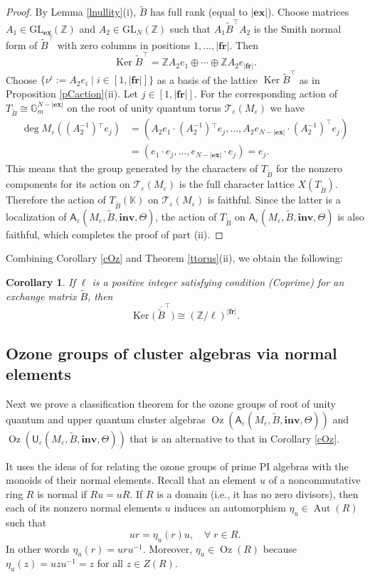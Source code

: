 \documentclass[11pt]{amsart}
\theoremstyle{plain}
\newtheorem{corollary}[theorem]{Corollary}
\newcommand \bco[1] { \begin{corollary}\label{c#1} }
\newcommand {\eco} { \end{corollary} }
\newcommand \thref[1]{Theorem \ref{t#1}}
\newcommand \leref[1]{Lemma \ref{l#1}}
\newcommand \prref[1]{Proposition \ref{p#1}}
\newcommand \coref[1]{Corollary \ref{c#1}}
\def \KK {{\mathbb C}}
\def \KK {{\mathbb K}}
\def \Gset {{\mathbb G}}
\def \Zset {{\mathbb Z}}
\def \A {{\boldsymbol{\mathsf A}}}
\def \U {{\boldsymbol{\mathsf U}}}
\def \B  {{\widetilde{B}}}
\newcommand \ex {{\mathbf{ex}}}
\newcommand \fr {{\mathbf{fr}}}
\newcommand \inv {{\mathbf{inv}}}
\def \TT {{\mathcal{T}}}
\def \ep {\varepsilon}
\def \ol {\overline}
\DeclareMathOperator \Aut { {\mathrm{Aut}} }
\DeclareMathOperator \Oz { {\mathrm{Oz}}}
\DeclareMathOperator \Ker { {\mathrm{Ker}} }
\begin{document}
\begin{proof}
By \leref{nullity}(i), $\B$ has full rank (equal to $|\ex|$). Choose matrices $A_1 \in \mathrm{GL}_{\ex}(\Zset)$ and 
$A_2 \in \mathrm{GL}_N(\Zset)$ such that 
$A_1 \B^\top A_2$ is the Smith normal form of $\B^\top$ with zero columns in positions $1, \ldots, |\fr|$. Then 
\[
\Ker \B^\top = \Zset A_2 e_1 \oplus \cdots \oplus \Zset A_2 e_{|\fr|}.
\]
Choose $\{\nu^i := A_2 e_i \mid i \in [1, |\fr|]\}$ as a basis of the lattice $\Ker \B^\top$ as in \prref{Caction}(ii). Let $j \in [1, |\fr|]$.
For the corresponding action of $T_{\B} \cong \Gset_m^{N - |\ex|}$ on the root of unity quantum torus $\TT_\ep(M_\ep)$ we have 
\begin{align*}
\deg M_\ep((A_2^{-1}){^\top} e_j ) &= 
(A_2 e_1 \cdot (A_2^{-1}){^\top} e_j, \dots, A_2e_{N-|\ex|} \cdot (A_2^{-1})^{\top} e_j) 
\\
&=(e_1 \cdot e_j, \ldots, e_{N- |\ex|} \cdot e_j) =
e_j.
\end{align*}
This means that the group generated by the characters of $T_\B$ for the nonzero components for its action on $\TT_\ep(M_\ep)$ 
is the full character lattice $X(T_\B)$. 
Therefore the action of $T_\B(\KK)$ on 
$\TT_\ep(M_\ep)$ is faithful. Since the latter is a localization of $\A_\ep(M_\ep, \B, \inv, \Theta)$, the action of $T_\B$ on $\A_\ep(M_\ep, \B, \inv, \Theta)$ is also faithful, which completes the proof of part (ii). 
\end{proof}
Combining \coref{Oz} and \thref{torus}(ii), we obtain the following:
\bco{isom-ker} If $\ell$ is a positive integer satisfying condition (Coprime) for an exchange matrix $\B$, then 
\[
\Ker \big( \, \ol{\B}^\top \big) \cong (\Zset/ \ell)^{|\fr|}.
\]
\eco

\subsection{Ozone groups of cluster algebras via normal elements}

Next we prove a classification theorem for the ozone groups of root of unity quantum and upper quantum cluster algebras 
$\Oz(\A_\ep(M_\ep, \B, \inv, \Theta))$ and $\Oz(\U_\ep(M_\ep, \B, \inv, \Theta))$ that is an alternative to that in \coref{Oz}. 

It uses the ideas of \cite{CGWZ2} for relating the ozone groups of prime PI algebras with the monoids of their normal elements. Recall that an element $u$ of a noncommutative ring $R$ is normal if $Ru =uR$. If $R$ is a domain (i.e., it has no zero divisors), then each of its nonzero normal elements $u$ induces an automorphism $\eta_u \in \Aut(R)$ such that 
\[
u r = \eta_u(r) u, \quad \forall \; r \in R.
\]
In other words $\eta_u(r) = u r u^{-1}$. Moreover, $\eta_u \in \Oz(R)$ because $\eta_u(z) = u z u^{-1} =z$ for all $z \in Z(R)$.
\end{document}
